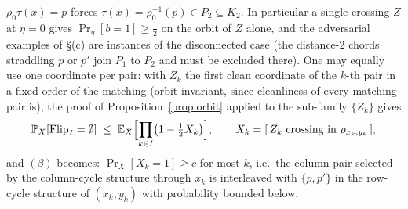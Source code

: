 $\rho_0\tau(x)=p$ forces $\tau(x)=\rho_0^{-1}(p)\in P_2\subseteq K_2$.
In particular a single crossing $Z$ at $\eta=0$ gives
$\Pr_\eta[b=1]\ge\tfrac12$ on the orbit of $Z$ alone, and the
adversarial examples of \S(c) are instances of the disconnected case
(the distance-$2$ chords straddling $p$ or $p'$ join $P_1$ to $P_2$
and must be excluded there).  One may equally use one coordinate per
pair: with $Z_k$ the first clean coordinate of the $k$-th pair in a
fixed order of the matching (orbit-invariant, since cleanliness of
every matching pair is), the proof of Proposition~\ref{prop:orbit}
applied to the sub-family $\{Z_k\}$ gives
\begin{equation}\label{eq:onecoord}
\mathbb{P}_X[\mathrm{Flip}_I=\emptyset]\;\le\;\mathbb{E}_X\Bigl[\prod_{k\in I}\bigl(1-\tfrac12X_k\bigr)\Bigr],
\qquad X_k=[\,Z_k\text{ crossing in }\rho_{x_k,y_k}\,],
\end{equation}
and $(\beta)$ becomes: $\Pr_X[X_k=1]\ge c$ for most $k$, i.e.\ the
column pair selected by the column-cycle structure through $x_k$ is
interleaved with $\{p,p'\}$ in the row-cycle structure of $(x_k,y_k)$
with probability bounded below.

